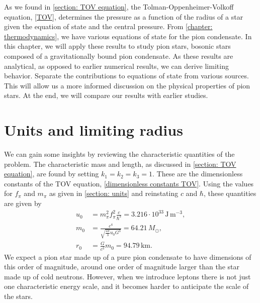 As we found in \autoref{section: TOV equation}, the Tolman-Oppenheimer-Volkoff equation, \autoref{TOV}, determines the pressure as a function of the radius of a star given the equation of state and the central pressure.
From \autoref{chapter: thermodynamics}, we have various equations of state for the pion condensate.
In this chapter, we will apply these results to study pion stars, bosonic stars composed of a gravitationally bound pion condensate.
As these results are analytical, as opposed to earlier numerical results, we can derive limiting behavior.
Separate the contributions to equations of state from various sources.
This will allow us a more informed discussion on the physical properties of pion stars.
At the end, we will compare our results with earlier studies.


\section{Units and limiting radius}

We can gain some insights by reviewing the characteristic quantities of the problem.
The characteristic mass and length, as discussed in \autoref{section: TOV equation}, are found by setting $k_1 = k_2 = k_3 = 1$.
These are the dimensionless constants of the TOV equation, \autoref{dimensionless constants TOV}.
Using the values for $f_\pi$ and $m_\pi$ as given in \autoref{section: units} and reinstating $c$ and $\hbar$, these quantities are given by
%
\begin{align}
    u_0 & =m_\pi^2 f_\pi^2 \frac{c}{\hbar^3}
    = 3.216\cdot 10^{33} \, \text{J}\,\text{m}^{-3}, \\
    m_0 & = \frac{c^4}{\sqrt{\frac{4 \pi}{ 3} u_0 G^3}} = 64.21\, M_\odot, \\
    r_0 & = \frac{G}{c^2} m_0 = 94.79 \, \text{km}.
\end{align}
%
We expect a pion star made up of a pure pion condensate to have dimensions of this order of magnitude, around one order of magnitude larger than the star made up of cold neutrons.
However, when we introduce leptons there is not just one characteristic energy scale, and it becomes harder to anticipate the scale of the stars.



